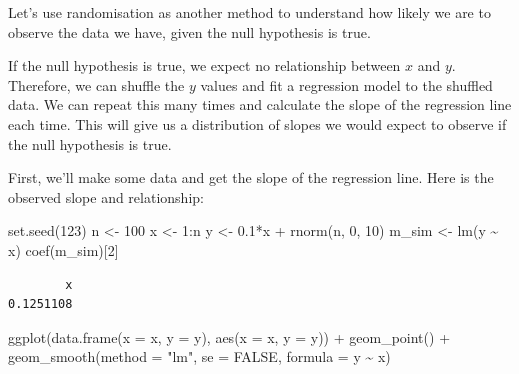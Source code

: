 \documentclass[
  letterpaper,
  8pt,
  a4paper]{book}
\newenvironment{Shaded}{\begin{snugshade}}{\end{snugshade}}
\newcommand{\AttributeTok}[1]{\textcolor[rgb]{0.40,0.45,0.13}{#1}}
\newcommand{\ConstantTok}[1]{\textcolor[rgb]{0.56,0.35,0.01}{#1}}
\newcommand{\DecValTok}[1]{\textcolor[rgb]{0.68,0.00,0.00}{#1}}
\newcommand{\FloatTok}[1]{\textcolor[rgb]{0.68,0.00,0.00}{#1}}
\newcommand{\FunctionTok}[1]{\textcolor[rgb]{0.28,0.35,0.67}{#1}}
\newcommand{\NormalTok}[1]{\textcolor[rgb]{0.00,0.23,0.31}{#1}}
\newcommand{\OtherTok}[1]{\textcolor[rgb]{0.00,0.23,0.31}{#1}}
\newcommand{\SpecialCharTok}[1]{\textcolor[rgb]{0.37,0.37,0.37}{#1}}
\newcommand{\StringTok}[1]{\textcolor[rgb]{0.13,0.47,0.30}{#1}}
\begin{document}
Let's use randomisation as another method to understand how likely we
are to observe the data we have, given the null hypothesis is true.

If the null hypothesis is true, we expect no relationship between \(x\)
and \(y\). Therefore, we can shuffle the \(y\) values and fit a
regression model to the shuffled data. We can repeat this many times and
calculate the slope of the regression line each time. This will give us
a distribution of slopes we would expect to observe if the null
hypothesis is true.

First, we'll make some data and get the slope of the regression line.
Here is the observed slope and relationship:

\begin{Shaded}
\begin{Highlighting}[]
\FunctionTok{set.seed}\NormalTok{(}\DecValTok{123}\NormalTok{)}
\NormalTok{n }\OtherTok{\textless{}{-}} \DecValTok{100}
\NormalTok{x }\OtherTok{\textless{}{-}} \DecValTok{1}\SpecialCharTok{:}\NormalTok{n}
\NormalTok{y }\OtherTok{\textless{}{-}} \FloatTok{0.1}\SpecialCharTok{*}\NormalTok{x }\SpecialCharTok{+} \FunctionTok{rnorm}\NormalTok{(n, }\DecValTok{0}\NormalTok{, }\DecValTok{10}\NormalTok{)}
\NormalTok{m\_sim }\OtherTok{\textless{}{-}} \FunctionTok{lm}\NormalTok{(y }\SpecialCharTok{\textasciitilde{}}\NormalTok{ x)}
\FunctionTok{coef}\NormalTok{(m\_sim)[}\DecValTok{2}\NormalTok{]}
\end{Highlighting}
\end{Shaded}

\begin{verbatim}
        x 
0.1251108 
\end{verbatim}

\begin{Shaded}
\begin{Highlighting}[]
\FunctionTok{ggplot}\NormalTok{(}\FunctionTok{data.frame}\NormalTok{(}\AttributeTok{x =}\NormalTok{ x, }\AttributeTok{y =}\NormalTok{ y), }\FunctionTok{aes}\NormalTok{(}\AttributeTok{x =}\NormalTok{ x, }\AttributeTok{y =}\NormalTok{ y)) }\SpecialCharTok{+}
  \FunctionTok{geom\_point}\NormalTok{() }\SpecialCharTok{+}
  \FunctionTok{geom\_smooth}\NormalTok{(}\AttributeTok{method =} \StringTok{"lm"}\NormalTok{, }\AttributeTok{se =} \ConstantTok{FALSE}\NormalTok{, }\AttributeTok{formula =}\NormalTok{ y }\SpecialCharTok{\textasciitilde{}}\NormalTok{ x) }
\end{Highlighting}
\end{Shaded}
\end{document}
